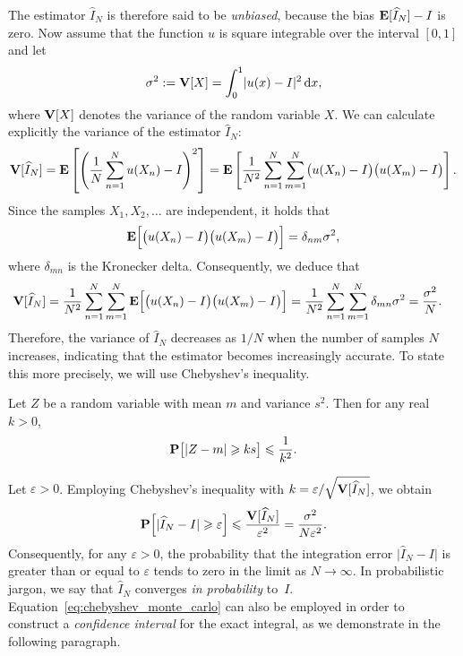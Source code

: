 The estimator $\widehat I_N$ is therefore said to be \emph{unbiased},
because the bias $\mathbf E [\widehat I_N] - I$ is zero.
Now assume that the function $u$ is square integrable over the interval $[0, 1]$ and let
\[
    \sigma^2 := \mathbf V[X] = \int_{0}^{1} \lvert u(x) - I \rvert^2 \, \mathrm d x,
\]
where $\mathbf V[X]$ denotes the variance of the random variable $X$.
We can calculate explicitly the variance of the estimator $\widehat I_N$:
\begin{align*}
    \mathbf V[\widehat I_N]
    = \mathbf E \left[ \left( \frac{1}{N} \sum_{n=1}^{N} u(X_n) - I \right)^2 \right]
    = \mathbf E \left[ \frac{1}{N^2} \sum_{n=1}^{N} \sum_{m=1}^{N} \bigl(u(X_n) - I\bigr) \bigl(u(X_m) - I\bigr) \right].
\end{align*}
Since the samples $X_1, X_2, \dotsc$ are independent,
it holds that
\[
    \mathbf E\Bigl[\bigl(u(X_n) - I\bigr) \bigl(u(X_m) - I\bigr)\Bigr] = \delta_{nm} \sigma^2,
\]
where $\delta_{mn}$ is the Kronecker delta.
Consequently, we deduce that
\begin{align*}
    \mathbf V[\widehat I_N]
    &=  \frac{1}{N^2} \sum_{n=1}^{N} \sum_{m=1}^{N} \mathbf E \Bigl[ \bigl(u(X_n) - I\bigr) \bigl(u(X_m) - I\bigr) \Bigr]
    =  \frac{1}{N^2} \sum_{n=1}^{N} \sum_{m=1}^{N} \delta_{mn} \sigma^2 = \frac{\sigma^2}{N}.
\end{align*}
Therefore, the variance of $\widehat I_N$ decreases as $1/N$ when the number of samples $N$ increases,
indicating that the estimator becomes increasingly accurate.
To state this more precisely,
we will use Chebyshev's inequality.
\begin{theorem}
    Let $Z$ be a random variable with mean $m$ and variance $s^2$.
    Then for any real $k > 0$,
    \[
        \mathbf P \bigl[ |Z - m|  \geqslant k s \bigr] \leqslant \frac{1}{k^2}.
    \]
\end{theorem}
Let $\varepsilon > 0$.
Employing Chebyshev's inequality with $k = \varepsilon / \sqrt{\mathbf V[\widehat I_N]}$,
we obtain
\begin{equation}
    \label{eq:chebyshev_monte_carlo}
    \mathbf P\Bigl[\lvert \widehat I_N - I \rvert \geqslant \varepsilon \Bigr]
    \leqslant \frac{\mathbf V[\widehat I_N]}{\varepsilon^2}
    = \frac{\sigma^2}{N \varepsilon^2}.
\end{equation}
Consequently, for any $\varepsilon > 0$,
the probability that the integration error $\bigl\lvert \widehat I_N - I \bigr\rvert$ is greater than or equal to $\varepsilon$ tends to zero in the limit as $N \to \infty$.
In probabilistic jargon, we say that $\widehat I_N$ converges \emph{in probability} to~$I$.
Equation~\eqref{eq:chebyshev_monte_carlo} can also be employed in order to construct a \emph{confidence interval} for the exact integral,
as we demonstrate in the following paragraph.


